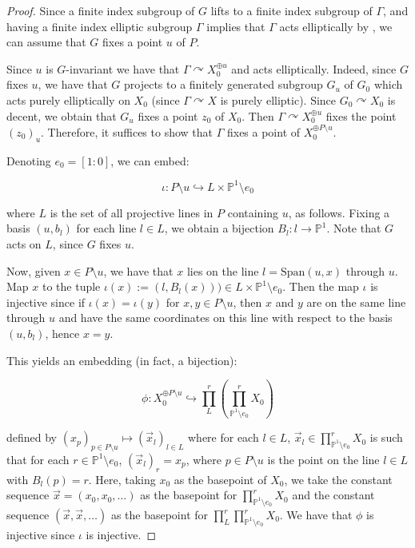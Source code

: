 \documentclass[12pt]{article}
\theoremstyle{definition}
\newcommand{\Span}{\mathrm{Span}}
\begin{document}
\begin{proof}
    Since a finite index subgroup of $G$ lifts to a finite index subgroup of $\Gamma$, and having a finite index elliptic subgroup $\Gamma$ implies that $\Gamma$ acts elliptically by \cite[Remark 4.2]{Algebraic}, we can assume that $G$ fixes a point $u$ of $P$. 

    Since $u$ is $G$-invariant we have that $\Gamma \curvearrowright X_0^{\oplus u}$ and acts elliptically. Indeed, since $G$ fixes $u$, we have that $G$ projects to a finitely generated subgroup $G_u$ of $G_0$ which acts purely elliptically on $X_0$ (since $\Gamma \curvearrowright X$ is purely elliptic). Since $G_0 \curvearrowright X_0$ is decent, we obtain that $G_u$ fixes a point $z_0$ of $X_0$. Then $\Gamma \curvearrowright X_0^{\oplus u}$ fixes the point $(z_0)_u$. Therefore, it suffices to show that $\Gamma$ fixes a point of $X_0^{\oplus P \setminus u}$. 

    Denoting $e_0 = [1:0]$, we can embed: 

    $$\iota: P \setminus u \hookrightarrow L \times \mathbb{P}^1 \setminus e_0$$

    where $L$ is the set of all projective lines in $P$ containing $u$, as follows. Fixing a basis $(u, b_l)$ for each line $l \in L$, we obtain a bijection $B_l : l \to \mathbb{P}^1$. Note that $G$ acts on $L$, since $G$ fixes $u$. 

    Now, given $x \in P \setminus u$, we have that $x$ lies on the line $l = \Span( u, x )$ through $u$. Map $x$ to the tuple $\iota(x):=(l, B_{l}(x))) \in L \times \mathbb{P}^1\setminus e_0$. Then the map $\iota$ is injective since if $\iota(x) = \iota(y)$ for $x,y \in P \setminus u$, then $x$ and $y$ are on the same line through $u$ and have the same coordinates on this line with respect to the basis $(u,b_l)$, hence $x=y$. 

    This yields an embedding (in fact, a bijection): 

    $$\phi : X_0^{\oplus P \setminus u} \hookrightarrow \prod_L^r (\prod_{\mathbb{P}^1\setminus e_0}^r X_0 ) $$

    defined by $(x_p)_{p \in P \setminus u} \mapsto (\vec{x}_l)_{l \in L}$ where for each $l \in L$, $\vec{x}_l \in  \prod_{\mathbb{P}^1\setminus e_0}^r X_0$ is such that for each $r \in \mathbb{P}^1 \setminus e_0$, $(\vec{x}_l)_r = x_p$, where $p \in P \setminus u$ is the point on the line $l \in L$ with $B_l(p) = r$. Here, taking $x_0$ as the basepoint of $X_0$, we take the constant sequence $\vec{x} = (x_0, x_0, \ldots)$ as the basepoint for $\prod_{\mathbb{P}^1\setminus e_0}^r X_0$ and the constant sequence $(\vec{x}, \vec{x}, \ldots)$ as the basepoint for $\prod_{L}^r \prod_{\mathbb{P}^1\setminus e_0}^r X_0$. We have that $\phi$ is injective since $\iota$ is injective. 


\end{proof}
\end{document}
